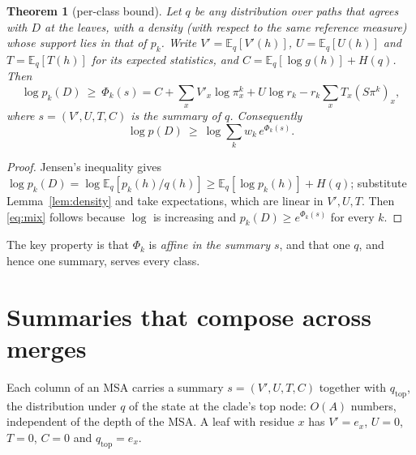 \documentclass[11pt]{article}
\newtheorem{theorem}{Theorem}
\newcommand{\E}{\mathbb E}
\begin{document}
\begin{theorem}[per-class bound]\label{thm:bound}
Let $q$ be any distribution over paths that agrees with $D$ at the leaves, with
a density (with respect to the same reference measure) whose support lies in
that of $p_k$. Write $V'=\E_q[V'(h)]$, $U=\E_q[U(h)]$ and $T=\E_q[T(h)]$ for
its expected statistics, and
$C=\E_q[\log g(h)]+H(q)$. Then
\begin{equation}\label{eq:Phi}
\log p_k(D)\ \ge\ \Phi_k(s)=C+\sum_xV'_x\log\pi^k_x+U\log r_k
 -r_k\sum_xT_x(S\pi^k)_x ,
\end{equation}
where $s=(V',U,T,C)$ is the \emph{summary} of $q$. Consequently
\begin{equation}\label{eq:mix}
\log p(D)\ \ge\ \log\sum_kw_k\,e^{\Phi_k(s)} .
\end{equation}
\end{theorem}
\begin{proof}
Jensen's inequality gives
$\log p_k(D)=\log\E_q[p_k(h)/q(h)]\ge\E_q[\log p_k(h)]+H(q)$; substitute
Lemma~\ref{lem:density} and take expectations, which are linear in $V',U,T$.
Then \eqref{eq:mix} follows because $\log$ is increasing and
$p_k(D)\ge e^{\Phi_k(s)}$ for every $k$.
\end{proof}

The key property is that $\Phi_k$ is \emph{affine in the summary $s$}, and
that one $q$, and hence one summary, serves every class.

\section{Summaries that compose across merges}
\label{sec:summaries}

Each column of an MSA carries a summary $s=(V',U,T,C)$ together with
$q_{\mathrm{top}}$, the distribution under $q$ of the state at the clade's top
node: $O(A)$ numbers, independent of the depth of the MSA. A leaf with residue
$x$ has $V'=e_x$, $U=0$, $T=0$, $C=0$ and $q_{\mathrm{top}}=e_x$.
\end{document}
